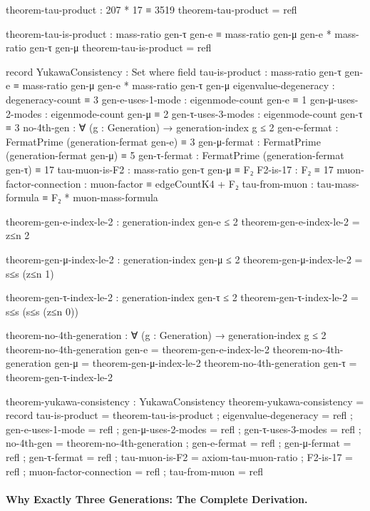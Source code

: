 \documentclass[11pt,a4paper]{book}
\begin{document}
\begin{code}
theorem-tau-product : 207 * 17 ≡ 3519
theorem-tau-product = refl

theorem-tau-is-product : mass-ratio gen-τ gen-e ≡ 
                         mass-ratio gen-μ gen-e * mass-ratio gen-τ gen-μ
theorem-tau-is-product = refl

record YukawaConsistency : Set where
  field
    tau-is-product : mass-ratio gen-τ gen-e ≡ 
                     mass-ratio gen-μ gen-e * mass-ratio gen-τ gen-μ
    eigenvalue-degeneracy : degeneracy-count ≡ 3
    gen-e-uses-1-mode : eigenmode-count gen-e ≡ 1
    gen-μ-uses-2-modes : eigenmode-count gen-μ ≡ 2
    gen-τ-uses-3-modes : eigenmode-count gen-τ ≡ 3
    no-4th-gen : ∀ (g : Generation) → generation-index g ≤ 2
    gen-e-fermat : FermatPrime (generation-fermat gen-e) ≡ 3
    gen-μ-fermat : FermatPrime (generation-fermat gen-μ) ≡ 5
    gen-τ-fermat : FermatPrime (generation-fermat gen-τ) ≡ 17
    tau-muon-is-F2 : mass-ratio gen-τ gen-μ ≡ F₂
    F2-is-17 : F₂ ≡ 17
    muon-factor-connection : muon-factor ≡ edgeCountK4 + F₂
    tau-from-muon : tau-mass-formula ≡ F₂ * muon-mass-formula

theorem-gen-e-index-le-2 : generation-index gen-e ≤ 2
theorem-gen-e-index-le-2 = z≤n {2}

theorem-gen-μ-index-le-2 : generation-index gen-μ ≤ 2
theorem-gen-μ-index-le-2 = s≤s (z≤n {1})

theorem-gen-τ-index-le-2 : generation-index gen-τ ≤ 2
theorem-gen-τ-index-le-2 = s≤s (s≤s (z≤n {0}))

theorem-no-4th-generation : ∀ (g : Generation) → generation-index g ≤ 2
theorem-no-4th-generation gen-e = theorem-gen-e-index-le-2
theorem-no-4th-generation gen-μ = theorem-gen-μ-index-le-2
theorem-no-4th-generation gen-τ = theorem-gen-τ-index-le-2

theorem-yukawa-consistency : YukawaConsistency
theorem-yukawa-consistency = record
  { tau-is-product = theorem-tau-is-product
  ; eigenvalue-degeneracy = refl
  ; gen-e-uses-1-mode = refl
  ; gen-μ-uses-2-modes = refl
  ; gen-τ-uses-3-modes = refl
  ; no-4th-gen = theorem-no-4th-generation
  ; gen-e-fermat = refl
  ; gen-μ-fermat = refl
  ; gen-τ-fermat = refl
  ; tau-muon-is-F2 = axiom-tau-muon-ratio
  ; F2-is-17 = refl
  ; muon-factor-connection = refl
  ; tau-from-muon = refl
  }
\end{code}

\paragraph{Why Exactly Three Generations: The Complete Derivation.}
\end{document}
